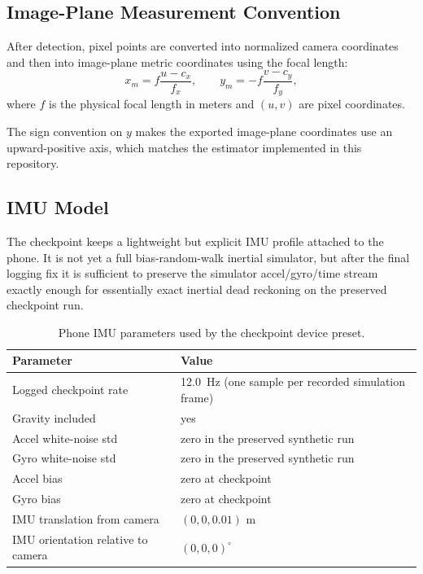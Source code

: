 \documentclass[11pt,a4paper]{article}
\begin{document}
\subsection{Image-Plane Measurement Convention}

After detection, pixel points are converted into normalized camera coordinates and then into image-plane metric coordinates using the focal length:
\[
x_m = f \frac{u-c_x}{f_x},\qquad
y_m = -f \frac{v-c_y}{f_y},
\]
where $f$ is the physical focal length in meters and $(u,v)$ are pixel coordinates.

The sign convention on $y$ makes the exported image-plane coordinates use an upward-positive axis, which matches the estimator implemented in this repository.

\subsection{IMU Model}

The checkpoint keeps a lightweight but explicit IMU profile attached to the phone.
It is not yet a full bias-random-walk inertial simulator, but after the final logging fix it is sufficient to preserve the simulator accel/gyro/time stream exactly enough for essentially exact inertial dead reckoning on the preserved checkpoint run.

\begin{table}[H]
\centering
\caption{Phone IMU parameters used by the checkpoint device preset.}
\label{tab:imu-model}
\begin{tabularx}{\linewidth}{l>{\raggedright\arraybackslash}X}
\toprule
Parameter & Value \\
\midrule
Logged checkpoint rate & \SI{12.0}{\hertz} (one sample per recorded simulation frame) \\
Gravity included & yes \\
Accel white-noise std & zero in the preserved synthetic run \\
Gyro white-noise std & zero in the preserved synthetic run \\
Accel bias & zero at checkpoint \\
Gyro bias & zero at checkpoint \\
IMU translation from camera & $(0, 0, 0.01)$ m \\
IMU orientation relative to camera & $(0, 0, 0)^\circ$ \\
\bottomrule
\end{tabularx}
\end{table}
\end{document}
